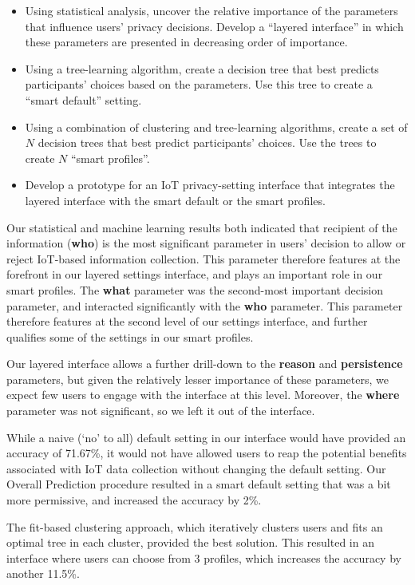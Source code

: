 \begin{itemize}
	\item Using statistical analysis, uncover the relative importance of the parameters that influence users' privacy decisions. Develop a ``layered interface'' in which these parameters are presented in decreasing order of importance.
	\item Using a tree-learning algorithm, create a decision tree that best predicts participants' choices based on the parameters. Use this tree to create a ``smart default'' setting.
	\item Using a combination of clustering and tree-learning algorithms, create a set of $N$ decision trees that best predict participants' choices. Use the trees to create $N$ ``smart profiles''.
	\item Develop a prototype for an IoT privacy-setting interface that integrates the layered interface with the smart default or the smart profiles.
\end{itemize}

Our statistical and machine learning results both indicated that recipient of the information (\textbf{who}) is the most significant parameter in users' decision to allow or reject IoT-based information collection. This parameter therefore features at the forefront in our layered settings interface, and plays an important role in our smart profiles. The \textbf{what} parameter was the second-most important decision parameter, and interacted significantly with the \textbf{who} parameter. This parameter therefore features at the second level of our settings interface, and further qualifies some of the settings in our smart profiles.

Our layered interface allows a further drill-down to the \textbf{reason} and \textbf{persistence} parameters, but given the relatively lesser importance of these parameters, we expect few users to engage with the interface at this level. Moreover, the \textbf{where} parameter was not significant, so we left it out of the interface.

While a naive (`no' to all) default setting in our interface would have provided an accuracy of 71.67\%, it would not have allowed users to reap the potential benefits associated with IoT data collection without changing the default setting. Our Overall Prediction procedure resulted in a smart default setting that was a bit more permissive, and increased the accuracy by 2\%.

The fit-based clustering approach, which iteratively clusters users and fits an optimal tree in each cluster, provided the best solution. This resulted in an interface where users can choose from 3 profiles, which increases the accuracy by another 11.5\%.

